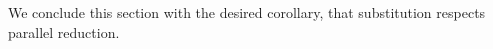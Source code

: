 \begin{fence}
\begin{code}%
\>[0]\AgdaSpace{}%
\AgdaSymbol{:}\AgdaSpace{}%
\AgdaSymbol{\}\{}\AgdaSymbol{\}\{}\AgdaSpace{}%
\AgdaSpace{}%
\AgdaSymbol{:}\AgdaSpace{}%
\AgdaSpace{}%
\AgdaSpace{}%
\AgdaSymbol{\}}\<%
\\
\>[0][@{}l@{\AgdaIndent{0}}]%
\>[7]\AgdaSpace{}%
\AgdaSpace{}%
\AgdaSpace{}%
\<%
\\
%
\>[7]\AgdaSpace{}%
\AgdaSpace{}%
\AgdaSymbol{(}\AgdaSpace{}%
\AgdaSymbol{)}\AgdaSpace{}%
\AgdaSymbol{(}\AgdaSpace{}%
\AgdaSymbol{)}\<%
\\
\>[0]\AgdaSpace{}%
\AgdaSymbol{\{}\AgdaSymbol{\}}\AgdaSpace{}%
\AgdaSymbol{\{}\AgdaSymbol{\}}\AgdaSpace{}%
\AgdaSpace{}%
\AgdaSymbol{\{}\AgdaSymbol{\}}\AgdaSpace{}%
\AgdaSymbol{\{}\AgdaSymbol{\}}\AgdaSpace{}%
\AgdaSymbol{=}\AgdaSpace{}%
\<%
\\
\>[0]\AgdaSpace{}%
\AgdaSymbol{\{}\AgdaSymbol{\}}\AgdaSpace{}%
\AgdaSymbol{\{}\AgdaSymbol{\}}\AgdaSpace{}%
\AgdaSpace{}%
\AgdaSymbol{\{}\AgdaSymbol{\}}\AgdaSpace{}%
\AgdaSymbol{\{}\AgdaSpace{}%
\AgdaSymbol{\}}\AgdaSpace{}%
\AgdaSymbol{=}\AgdaSpace{}%
\<%
\end{code}
\end{fence}

We conclude this section with the desired corollary, that substitution
respects parallel reduction.

